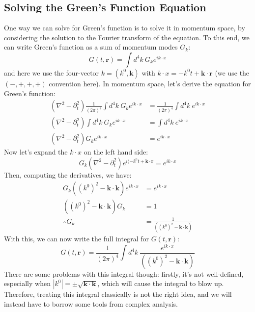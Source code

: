 \subsection{Solving the Green's Function Equation}
One way we can solve for Green's function is to solve it in momentum space, by considering the solution to
the Fourier transform of the equation. To this end, we can write Green's function as a sum of momentum modes
\( G_k \):
\[
	G(t, \mathbf{r}) = \int d^{4}k \ G_k e^{i k \cdot x}
\]
and here we use the four-vector \( k = (k^{0}, \mathbf{k}) \) with \( k \cdot x = -k^{0}t + \mathbf{k} \cdot
\mathbf{r} \) (we use the \( (-, +, +, +) \) convention here). In momentum space, let's derive the equation
for Green's function:
\begin{align*}
	\left(\nabla^2 - \partial_t^2\right) \frac{1}{(2\pi)^{4}}\int d^{4}k \ G_k e^{i k \cdot x} 
	&= \frac{1}{(2\pi)^{4}}
	\int d^{4}k \ e^{ik \cdot x}\\
	\left(\nabla^2 - \partial_t^2\right) \int d^{4}k \ G_k e^{ik \cdot x} &= \int d^{4}k \ e^{i k \cdot x}\\
	\left(\nabla^2 - \partial_t^2\right) G_k e^{ik \cdot x} &= e^{ik \cdot x}
\end{align*}
Now let's expand the \( k \cdot x \) on the left hand side:
\[
	G_k \left( \nabla^2 - \partial_t^2 \right)e^{i(- k^{0}t + \mathbf{k} \cdot \mathbf{r}} = e^{ik \cdot x}
\]
Then, computing the derivatives, we have:
\begin{align*}
	G_k \left( (k^{0})^2 - \mathbf{k} \cdot \mathbf{k} \right)e^{i k\cdot x} &= e^{i k \cdot x}\\
	\left( (k^{0})^2 - \mathbf{k} \cdot \mathbf{k} \right)G_k &=  1 \\ 
	\therefore G_k &=  \frac{1}{\left( (k^{0})^2 - \mathbf{k} \cdot \mathbf{k} \right)} 
\end{align*}
With this, we can now write the full integral for \( G(t, \mathbf{r}) \):
\begin{equation}
	\label{19:greens-function}
	G(t, \mathbf{r}) = \frac{1}{(2\pi)^{4}} \int d^{4}k \ \frac{e^{i k \cdot x}}{\left( (k^{0})^2 -
	\mathbf{k} \cdot \mathbf{k} \right)}
\end{equation}
There are some problems with this integral though: firstly, it's not well-defined, especially when \( |k^{0}|
= \pm \sqrt{\mathbf{k}\cdot \mathbf{k}}\), which will cause the integral to blow up. Therefore, treating this
integral classically is not the right idea, and we will instead have to borrow some tools from complex
analysis.    
 
 
  




